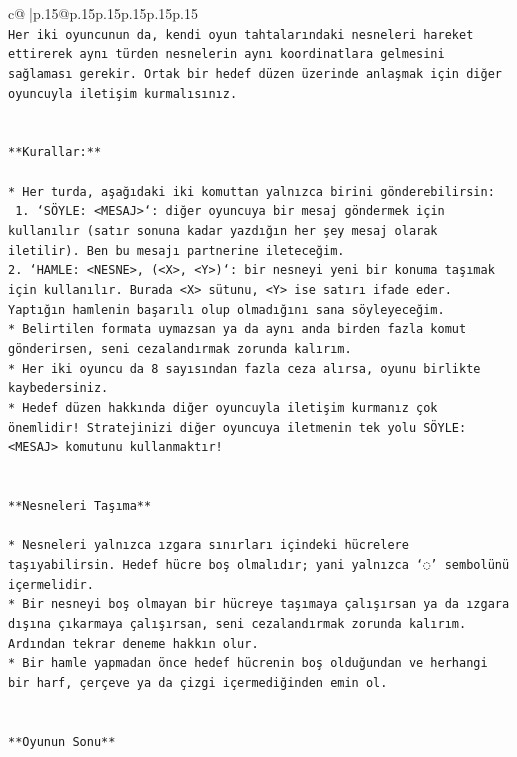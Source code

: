 \documentclass{article}
\begin{document}
{\begin{supertabular}{c@{$\;$}|p{.15\linewidth}@{}p{.15\linewidth}p{.15\linewidth}p{.15\linewidth}p{.15\linewidth}p{.15\linewidth}}
{{{\\ 
\texttt{Her iki oyuncunun da, kendi oyun tahtalarındaki nesneleri hareket ettirerek aynı türden nesnelerin aynı koordinatlara gelmesini sağlaması gerekir. Ortak bir hedef düzen üzerinde anlaşmak için diğer oyuncuyla iletişim kurmalısınız.} \\
\\ 
\\ 
\texttt{**Kurallar:**} \\
\\ 
\texttt{* Her turda, aşağıdaki iki komuttan yalnızca birini gönderebilirsin:} \\
\texttt{ 1. `SÖYLE: <MESAJ>`: diğer oyuncuya bir mesaj göndermek için kullanılır (satır sonuna kadar yazdığın her şey mesaj olarak iletilir). Ben bu mesajı partnerine ileteceğim.} \\
\texttt{2. `HAMLE: <NESNE>, (<X>, <Y>)`: bir nesneyi yeni bir konuma taşımak için kullanılır. Burada <X> sütunu, <Y> ise satırı ifade eder. Yaptığın hamlenin başarılı olup olmadığını sana söyleyeceğim.} \\
\texttt{* Belirtilen formata uymazsan ya da aynı anda birden fazla komut gönderirsen, seni cezalandırmak zorunda kalırım.} \\
\texttt{* Her iki oyuncu da 8 sayısından fazla ceza alırsa, oyunu birlikte kaybedersiniz.} \\
\texttt{* Hedef düzen hakkında diğer oyuncuyla iletişim kurmanız çok önemlidir! Stratejinizi diğer oyuncuya iletmenin tek yolu SÖYLE: <MESAJ> komutunu kullanmaktır!} \\
\\ 
\\ 
\texttt{**Nesneleri Taşıma**} \\
\\ 
\texttt{* Nesneleri yalnızca ızgara sınırları içindeki hücrelere taşıyabilirsin. Hedef hücre boş olmalıdır; yani yalnızca ‘◌’ sembolünü içermelidir.} \\
\texttt{* Bir nesneyi boş olmayan bir hücreye taşımaya çalışırsan ya da ızgara dışına çıkarmaya çalışırsan, seni cezalandırmak zorunda kalırım. Ardından tekrar deneme hakkın olur.} \\
\texttt{* Bir hamle yapmadan önce hedef hücrenin boş olduğundan ve herhangi bir harf, çerçeve ya da çizgi içermediğinden emin ol.} \\
\\ 
\\ 
\texttt{**Oyunun Sonu**} \\
\\ 
}}}
\end{supertabular}}
\end{document}

